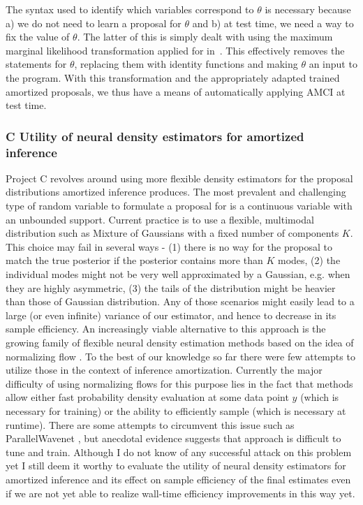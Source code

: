\documentclass[12pt]{article}
\begin{document}
The syntax used to identify which variables correspond to
$\theta$ is necessary because
a) we do not need to learn a proposal for $\theta$ and b) at test time, we need
a way to fix the value of $\theta$.  The latter of this is simply dealt
with using the maximum marginal likelihood transformation applied for 
in~\cite{rainforth2017thesis}.   This effectively removes the
\sample statements for $\theta$, replacing them with identity functions
and making $\theta$ an input to the program.  With this transformation and
the appropriately adapted trained amortized proposals, we thus
have a means of automatically applying AMCI at test time.


\subsubsection*{C \quad Utility of neural density estimators for amortized inference}
Project C revolves around using more flexible density estimators for the proposal distributions amortized inference produces.
The most prevalent and challenging type of random variable to formulate a proposal for is a continuous variable with an unbounded support.
Current practice is to use a flexible, multimodal distribution such as Mixture of Gaussians with a fixed number of components $K$.
This choice may fail in several ways - 
(1) there is no way for the proposal to match the true posterior if the posterior contains more than $K$ modes,
(2) the individual modes might not be very well approximated by a Gaussian, e.g. when they are highly asymmetric,
(3) the tails of the distribution might be heavier than those of Gaussian distribution.
Any of those scenarios might easily lead to a large (or even infinite) variance of our estimator, and hence to decrease in its sample efficiency.
An increasingly viable alternative to this approach is the growing family of flexible neural density estimation methods based on the idea of normalizing flow \citep{RezendeMohamed2015}.
To the best of our knowledge so far there were few attempts to utilize those in the context of inference amortization.
Currently the major difficulty of using normalizing flows for this purpose lies in the fact that methods allow either fast probability density evaluation at some data point $y$ (which is necessary for training) or the ability to efficiently sample (which is necessary at runtime).
There are some attempts to circumvent this issue such as ParallelWavenet \citep{ParallelWavenet}, but anecdotal evidence suggests that approach is difficult to tune and train.
Although I do not know of any successful attack on this problem yet I still deem it worthy to evaluate the utility of neural density estimators for amortized inference and its effect on sample efficiency of the final estimates even if we are not yet able to realize wall-time efficiency improvements in this way yet.
\end{document}
